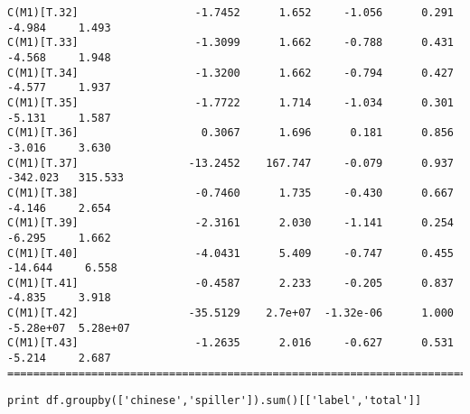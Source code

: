 \documentclass[12pt,fleqn]{article}\usepackage{../common}
\begin{document}
\begin{verbatim}
C(M1)[T.32]                  -1.7452      1.652     -1.056      0.291        -4.984     1.493
C(M1)[T.33]                  -1.3099      1.662     -0.788      0.431        -4.568     1.948
C(M1)[T.34]                  -1.3200      1.662     -0.794      0.427        -4.577     1.937
C(M1)[T.35]                  -1.7722      1.714     -1.034      0.301        -5.131     1.587
C(M1)[T.36]                   0.3067      1.696      0.181      0.856        -3.016     3.630
C(M1)[T.37]                 -13.2452    167.747     -0.079      0.937      -342.023   315.533
C(M1)[T.38]                  -0.7460      1.735     -0.430      0.667        -4.146     2.654
C(M1)[T.39]                  -2.3161      2.030     -1.141      0.254        -6.295     1.662
C(M1)[T.40]                  -4.0431      5.409     -0.747      0.455       -14.644     6.558
C(M1)[T.41]                  -0.4587      2.233     -0.205      0.837        -4.835     3.918
C(M1)[T.42]                 -35.5129    2.7e+07  -1.32e-06      1.000     -5.28e+07  5.28e+07
C(M1)[T.43]                  -1.2635      2.016     -0.627      0.531        -5.214     2.687
=============================================================================================
\end{verbatim}

\begin{verbatim}
print df.groupby(['chinese','spiller']).sum()[['label','total']]
\end{verbatim}
\end{document}
